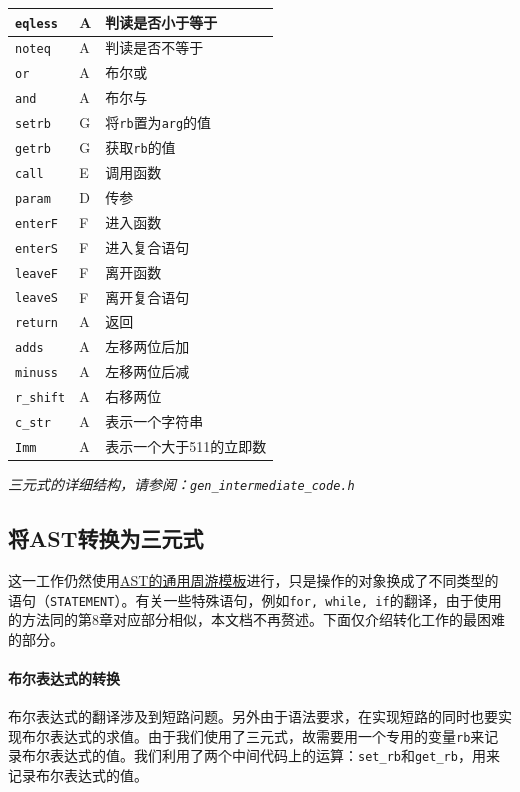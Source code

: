 \begin{center}
\begin{minipage}{0.48\textwidth}
\begin{flushright}
\begin{tabular}{|l|l|l|}
	\hline
		\verb|eqless| & A & 判读是否小于等于\\
	\hline 
		\verb|noteq| & A & 判读是否不等于\\
	\hline 
		\verb|or| & A & 布尔或\\
	\hline 
		\verb|and| & A & 布尔与\\
	\hline 
		\verb|setrb| & G & 将\verb|rb|置为\verb|arg|的值\\
	\hline 
		\verb|getrb| & G & 获取\verb|rb|的值\\
	\hline 
		\verb|call| & E & 调用函数\\
	\hline 
		\verb|param| & D & 传参\\
	\hline 
		\verb|enterF| & F & 进入函数\\
	\hline 
		\verb|enterS| & F & 进入复合语句\\
	\hline 
		\verb|leaveF| & F & 离开函数\\
	\hline 
		\verb|leaveS| & F & 离开复合语句\\
	\hline 
		\verb|return| & A & 返回\\
	\hline
		\verb|adds| & A & 左移两位后加\\
	\hline
		\verb|minuss| & A & 左移两位后减\\
	\hline 
		\verb|r_shift| & A & 右移两位\\
	\hline 
		\verb|c_str| & A & 表示一个字符串\\
	\hline
		\verb|Imm| & A & 表示一个大于511的立即数\\
	\hline
	\end{tabular}
\end{flushright}
\end{minipage}
\end{center}
{\it \anchor 三元式的详细结构，请参阅：\verb|gen_intermediate_code.h|}\\
\subsection{将AST转换为三元式}
这一工作仍然使用\hyperref[ASTtravesal]{AST的通用周游模板}进行，只是操作的对象换成了不同类型的语句（\verb|STATEMENT|）。有关一些特殊语句，例如\verb|for, while, if|的翻译，由于使用的方法同\cite{sunjiasu}的第8章对应部分相似，本文档不再赘述。下面仅介绍转化工作的最困难的部分。
\paragraph*{布尔表达式的转换}
\label{ASTtotriple}
布尔表达式的翻译涉及到短路问题。另外由于语法要求，在实现短路的同时也要实现布尔表达式的求值。由于我们使用了三元式，故需要用一个专用的变量\verb|rb|来记录布尔表达式的值。我们利用了两个中间代码上的运算：\verb|set_rb|和\verb|get_rb|，用来记录布尔表达式的值。

